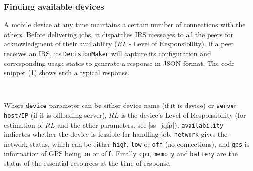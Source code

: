 \documentclass{sig-alternate}[10pt]
\begin{document}
\subsubsection{Finding available devices}\label{ss_dfp}

A mobile device at any time maintains a certain number of connections with the others. Before delivering jobs, it dispatches IRS messages to all the peers for acknowledgment of their availability ($RL$ - Level of Responsibility). If a peer receives an IRS, its \texttt{DecisionMaker} will capture its configuration and corresponding usage states to generate a response in JSON format, The code snippet (\ref{code:jsonResponse}) shows such a typical response.\\

\begin{figure}
\noindent {}	\\
\noindent {}	

\label{code:jsonResponse}

\end{figure}

Where \texttt{device} parameter can be either device name (if it is device) or \texttt{server host/IP} (if it is offloading server), $RL$ is the device's Level of Responsibility (for estimation of $RL$ and the other parameters, see \ref{ss_jqfp}), \texttt{availability} indicates whether the device is feasible for handling job. \texttt{network} gives the network status, which can be either \texttt{high}, \texttt{low} or \texttt{off} (no connections), and \texttt{gps} is information of GPS being \texttt{on} or \texttt{off}. Finally \texttt{cpu}, \texttt{memory} and \texttt{battery} are the status of the essential resources at the time of response. 
\end{document}
